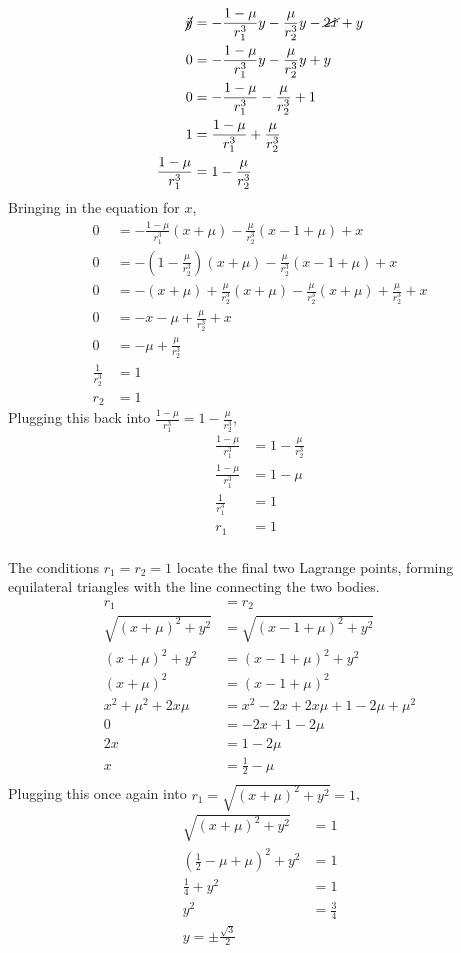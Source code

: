 \documentclass{article}
\begin{document}
\[\begin{aligned}
    \cancel{\ddot{y}}&=-\frac{1-\mu}{r_1^3}y-\frac{\mu}{r_2^3}y-\cancel{2\dot{x}}+y\\
    0&=-\frac{1-\mu}{r_1^3}y-\frac{\mu}{r_2^3}y+y\\
    0&=-\frac{1-\mu}{r_1^3}-\frac{\mu}{r_2^3}+1\\
    1&=\frac{1-\mu}{r_1^3}+\frac{\mu}{r_2^3}\\
    \frac{1-\mu}{r_1^3}&=1-\frac{\mu}{r_2^3}\\
\end{aligned}\]
Bringing in the equation for $x$,
\[\begin{aligned}
    0&=-\frac{1-\mu}{r_1^3}(x+\mu)-\frac{\mu}{r_2^3}(x-1+\mu)+x\\
    0&=-\left(1-\frac{\mu}{r_2^3}\right)(x+\mu)-\frac{\mu}{r_2^3}(x-1+\mu)+x\\
    0&=-(x+\mu)+\frac{\mu}{r_2^3}(x+\mu)-\frac{\mu}{r_2^3}(x+\mu)+\frac{\mu}{r_2^3}+x\\
    0&=-x-\mu+\frac{\mu}{r_2^3}+x\\
    0&=-\mu+\frac{\mu}{r_2^3}\\
    \frac{1}{r_2^3}&=1\\
    r_2&=1
\end{aligned}\]
Plugging this back into $\frac{1-\mu}{r_1^3}=1-\frac{\mu}{r_2^3}$,
\[\begin{aligned}
    \frac{1-\mu}{r_1^3}&=1-\frac{\mu}{r_2^3}\\
    \frac{1-\mu}{r_1^3}&=1-\mu\\
    \frac{1}{r_1^3}&=1\\
    r_1&=1\\
\end{aligned}\]

The conditions $r_1=r_2=1$ locate the final two Lagrange points, forming equilateral triangles with the line connecting the two bodies.
\[\begin{aligned}
    r_1&=r_2\\
    \sqrt{(x+\mu)^2+y^2}&=\sqrt{(x-1+\mu)^2+y^2}\\
    (x+\mu)^2+y^2&=(x-1+\mu)^2+y^2\\
    (x+\mu)^2&=(x-1+\mu)^2\\
    x^2+\mu^2+2x\mu&=x^2-2x+2x\mu+1-2\mu+\mu^2\\
    0&=-2x+1-2\mu\\
    2x&=1-2\mu\\
    x&=\frac{1}{2}-\mu\\
\end{aligned}\]
Plugging this once again into $r_1=\sqrt{(x+\mu)^2+y^2}=1$,
\[\begin{aligned}
    \sqrt{(x+\mu)^2+y^2}&=1\\
    \left(\frac{1}{2}-\mu+\mu\right)^2+y^2&=1\\
    \frac{1}{4}+y^2&=1\\
    y^2&=\frac{3}{4}\\
    y=\pm\frac{\sqrt{3}}{2}
\end{aligned}\]
\end{document}
